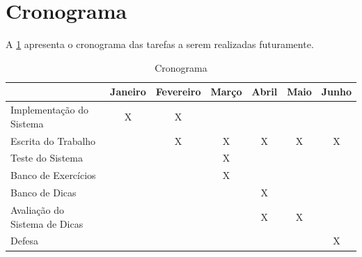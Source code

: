 \section{Cronograma}

A \cref{tabela:cronograma} apresenta o cronograma das tarefas a serem realizadas futuramente.

\begin{table}[ht]
	\captionsetup{justification=centering}
	\caption{Cronograma}
	\label{tabela:cronograma}
	\begin{tabular}{|l|c|c|c|c|c|c|}
		\hline
		& Janeiro & Fevereiro & Março & Abril & Maio & Junho \\ \hline
		Implementação do Sistema 		& X       & X         &       &       &      &       \\ \hline
		Escrita do Trabalho      		&         & X         & X     & X     & X    & X     \\ \hline
		Teste do Sistema         		&         &           & X     &       &      &       \\ \hline
		Banco de Exercícios      		&         &           & X     &       &      &       \\ \hline
		Banco de Dicas           		&         &           &       & X     &      &       \\ \hline
		Avaliação do Sistema de Dicas   &         &           &       & X     & X    &       \\ \hline
		Defesa                     		&         &           &       &       &      & X     \\ \hline
		\end{tabular}
		\end{table}